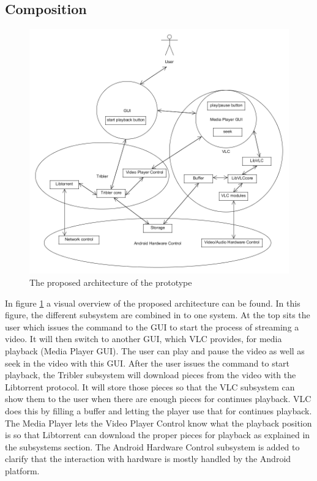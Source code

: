 \subsection{Composition}
\label{sec:comp}
\begin{figure}[h!]
	\includegraphics[scale=0.47]{images/architecture_overview.png}
	\caption{The proposed architecture of the prototype}
	\label{fig:prop_arch}
\end{figure}
In figure \ref{fig:prop_arch} a visual overview of the proposed architecture can be found. In this figure, the different subsystem are combined in to one system. At the top sits the user which issues the command to the GUI to start the process of streaming a video. It will then switch to another GUI, which VLC provides, for media playback (Media Player GUI). The user can play and pause the video as well as seek in the video with this GUI. After the user issues the command to start playback, the Tribler subsystem will download pieces from the video with the Libtorrent protocol. It will store those pieces so that the VLC subsystem can show them to the user when there are enough pieces for continues playback. VLC does this by filling a buffer and letting the player use that for continues playback. The Media Player lets the Video Player Control know what the playback position is so that Libtorrent can download the proper pieces for playback as explained in the subsystems section. The Android Hardware Control subsystem is added to clarify that the interaction with hardware is mostly handled by the Android platform.